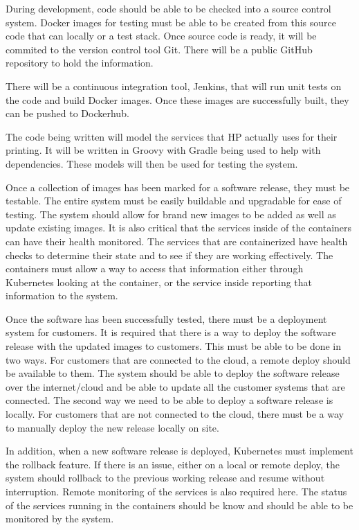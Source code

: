 \documentclass[onecolumn, draftclsnofoot,10pt, compsoc]{IEEEtran}
\begin{document}
During development, code should be able to be checked into a source control system. Docker images for testing must be able to be created from this source code that can locally or a test stack. Once source code is ready, it will be commited to the version control tool Git. There will be a public GitHub repository to hold the information. 

There will be a continuous integration tool, Jenkins, that will run unit tests on the code and build Docker images. Once these images are successfully built, they can be pushed to Dockerhub. 

The code being written will model the services that HP actually uses for their printing. It will be written in Groovy with Gradle being used to help with dependencies. These models will then be used for testing the system.

Once a collection of images has been marked for a software release, they must be testable. The entire system must be easily buildable and upgradable for ease of testing. The system should allow for brand new images to be added as well as update existing images. It is also critical that the services inside of the containers can have their health monitored. The services that are containerized have health checks to determine their state and to see if they are working effectively. The containers must allow a way to access that information either through Kubernetes looking at the container, or the service inside reporting that information to the system. 

	Once the software has been successfully tested, there must be a deployment system for customers. It is required that there is a way to deploy the software release with the updated images to customers. This must be able to be done in two ways. For customers that are connected to the cloud, a remote deploy should be available to them. The system should be able to deploy the software release over the internet/cloud and be able to update all the customer systems that are connected. The second way we need to be able to deploy a software release is locally. For customers that are not connected to the cloud, there must be a way to manually deploy the new release locally on site. 
	
	In addition, when a new software release is deployed, Kubernetes must implement the rollback feature. If there is an issue, either on a local or remote deploy, the system should rollback to the previous working release and resume without interruption. Remote monitoring of the services is also required here. The status of the services running in the containers should be know and should be able to be monitored by the system. 
\end{document}
